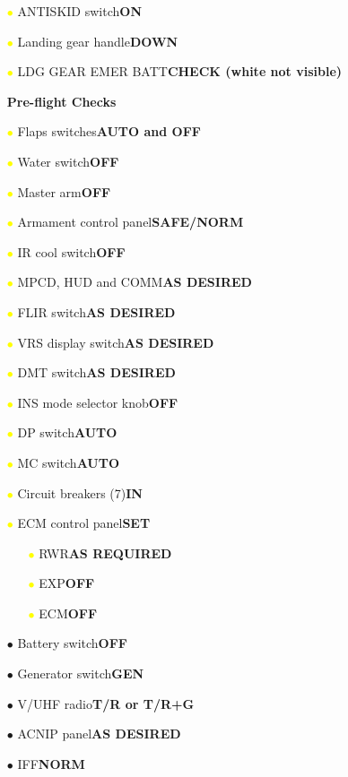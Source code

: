 \documentclass[a4paper,12pt,dvipsnames]{letter}
\newcommand{\button}[1]{\textbf{#1}}
\newcommand{\bi}{\textcolor{ProcessBlue}{$\bullet$\;}}
\newcommand{\yi}{\textcolor{Yellow}{$\bullet$\;}}
\begin{document}
{\begin{itemize}
\item[\yi] ANTISKID switch\dotfill\button{ON}
\item[\yi] Landing gear handle\dotfill\button{DOWN}
\item[\yi] LDG GEAR EMER BATT\dotfill\button{CHECK (white not visible)}
\end{itemize}
\newpage
\begin{itemize}
\item[] {\LARGE\textbf{Pre-flight Checks}}
\item[\yi] Flaps switches\dotfill\button{AUTO and OFF}
\item[\yi] Water switch\dotfill\button{OFF}
\item[\yi] Master arm\dotfill\button{OFF}
\item[\yi] Armament control panel\dotfill\button{SAFE/NORM}
\item[\yi] IR cool switch\dotfill\button{OFF}
\item[\yi] MPCD, HUD and COMM\dotfill\button{AS DESIRED}
\item[\yi] FLIR switch\dotfill\button{AS DESIRED}
\item[\yi] VRS display switch\dotfill\button{AS DESIRED}
\item[\yi] DMT switch\dotfill\button{AS DESIRED}
\item[\yi] INS mode selector knob\dotfill\button{OFF}
\item[\yi] DP switch\dotfill\button{AUTO}
\item[\yi] MC switch\dotfill\button{AUTO}
\item[\yi] Circuit breakers (7)\dotfill\button{IN}
\item[\yi] ECM control panel\dotfill\button{SET}
\begin{itemize}
 \item[\yi] RWR\dotfill\button{AS REQUIRED}
 \item[\yi] EXP\dotfill\button{OFF}
 \item[\yi] ECM\dotfill\button{OFF}
\end{itemize}
\item[\bi] Battery switch\dotfill\button{OFF}
\item[\bi] Generator switch\dotfill\button{GEN}
\item[\bi] V/UHF radio\dotfill\button{T/R or T/R+G}
\item[\bi] ACNIP panel\dotfill\button{AS DESIRED}
\item[\bi] IFF\dotfill\button{NORM}

\end{itemize}}
\end{document}
